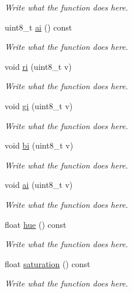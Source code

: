 \begin{DoxyCompactItemize}
\begin{DoxyCompactList}\small\item\em Write what the function does here. \end{DoxyCompactList}\item 
uint8\+\_\+t \hyperlink{structColor_a406d742636a93a8e56ad23397e2d6282}{ai} () const 
\begin{DoxyCompactList}\small\item\em Write what the function does here. \end{DoxyCompactList}\item 
void \hyperlink{structColor_a07877844fd9c61ff03deae704488a7f8}{ri} (uint8\+\_\+t v)
\begin{DoxyCompactList}\small\item\em Write what the function does here. \end{DoxyCompactList}\item 
void \hyperlink{structColor_a23239a2546a4cb8303d07a00c1d56cc1}{gi} (uint8\+\_\+t v)
\begin{DoxyCompactList}\small\item\em Write what the function does here. \end{DoxyCompactList}\item 
void \hyperlink{structColor_a649118ac60fc51e639c6d867165818df}{bi} (uint8\+\_\+t v)
\begin{DoxyCompactList}\small\item\em Write what the function does here. \end{DoxyCompactList}\item 
void \hyperlink{structColor_a6ee773cfcf2ddb37c893a93117ab4a3a}{ai} (uint8\+\_\+t v)
\begin{DoxyCompactList}\small\item\em Write what the function does here. \end{DoxyCompactList}\item 
float \hyperlink{structColor_a183b93e13e713514a4bee5fdbd8a5a9b}{hue} () const 
\begin{DoxyCompactList}\small\item\em Write what the function does here. \end{DoxyCompactList}\item 
float \hyperlink{structColor_a225af5fdfba5d0d6d4d660a1f4c9a509}{saturation} () const 
\begin{DoxyCompactList}\small\item\em Write what the function does here. \end{DoxyCompactList}\item 

\end{DoxyCompactItemize}
